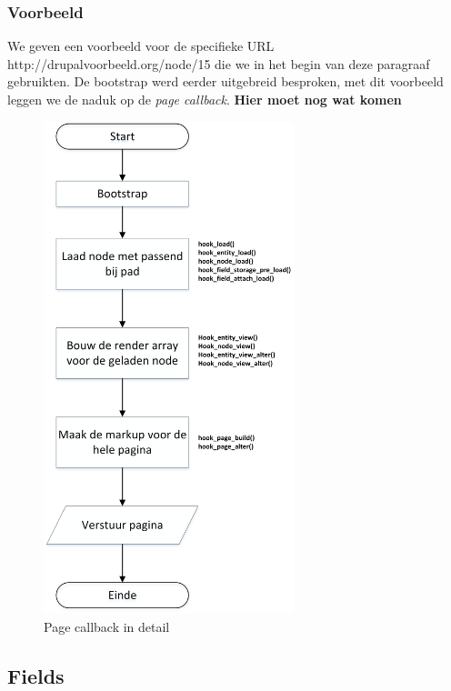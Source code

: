 \subsubsection{Voorbeeld}
We geven een voorbeeld voor de specifieke URL http://drupalvoorbeeld.org/node/15 die we in het begin van deze paragraaf gebruikten. De bootstrap werd eerder uitgebreid besproken, met dit voorbeeld leggen we de naduk op de \textit{page callback}. \textbf{Hier moet nog wat komen}
\begin{figure}
\centering
\hspace{55pt}
\includegraphics[width=0.65\textwidth]{fig/pageCallback}
\hspace{-50pt}
\caption{Page callback in detail}
\label{fig:drupalPageCallback}
\end{figure}

\subsection{Fields}\label{Fields}
